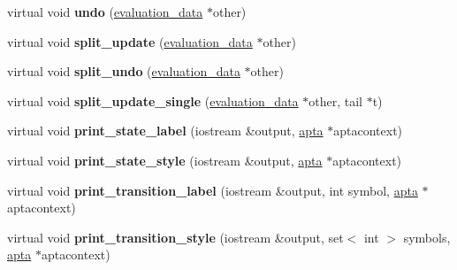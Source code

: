 \begin{DoxyCompactItemize}
\item 
\mbox{\label{classevaluation__data_a14974d8526bdfbf7a05a4d2f53378b0e}} 
virtual void {\bfseries undo} (\hyperlink{classevaluation__data}{evaluation\+\_\+data} $\ast$other)
\item 
\mbox{\label{classevaluation__data_ac7771505edd9817b9851c0189a57b166}} 
virtual void {\bfseries split\+\_\+update} (\hyperlink{classevaluation__data}{evaluation\+\_\+data} $\ast$other)
\item 
\mbox{\label{classevaluation__data_afd8508c59a0edad2024bcf0ab8b783c1}} 
virtual void {\bfseries split\+\_\+undo} (\hyperlink{classevaluation__data}{evaluation\+\_\+data} $\ast$other)
\item 
\mbox{\label{classevaluation__data_a8ac65b82d210e8bb2734a74ba076de5c}} 
virtual void {\bfseries split\+\_\+update\+\_\+single} (\hyperlink{classevaluation__data}{evaluation\+\_\+data} $\ast$other, tail $\ast$t)
\item 
\mbox{\label{classevaluation__data_a42ec54d6111c2dc9979b679c714e03f3}} 
virtual void {\bfseries print\+\_\+state\+\_\+label} (iostream \&output, \hyperlink{classapta}{apta} $\ast$aptacontext)
\item 
\mbox{\label{classevaluation__data_a6cb73abd19dc438a0060fc675486703f}} 
virtual void {\bfseries print\+\_\+state\+\_\+style} (iostream \&output, \hyperlink{classapta}{apta} $\ast$aptacontext)
\item 
\mbox{\label{classevaluation__data_a42616b2b65dcce18c38db0198c0c6357}} 
virtual void {\bfseries print\+\_\+transition\+\_\+label} (iostream \&output, int symbol, \hyperlink{classapta}{apta} $\ast$aptacontext)
\item 
\mbox{\label{classevaluation__data_addc2c82524a7056090084c65560e13ab}} 
virtual void {\bfseries print\+\_\+transition\+\_\+style} (iostream \&output, set$<$ int $>$ symbols, \hyperlink{classapta}{apta} $\ast$aptacontext)
\item 
\mbox{\label{classevaluation__data_ada5835b17f5ef387ca30031bdd63cd4c}} 

\end{DoxyCompactItemize}
